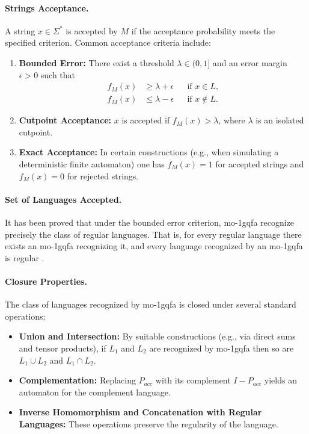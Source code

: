 \paragraph{Strings Acceptance.}  
A string $x\in\Sigma^*$ is accepted by $M$ if the acceptance probability meets the specified criterion. Common acceptance criteria include:
\begin{enumerate}
  \item \textbf{Bounded Error:} There exist a threshold $\lambda\in(0,1]$ and an error margin $\epsilon>0$ such that
  \[
  \begin{aligned}
  f_M(x) &\ge \lambda+\epsilon &&\text{if } x\in L,\\[1mm]
  f_M(x) &\le \lambda-\epsilon &&\text{if } x\notin L.
  \end{aligned}
  \]
  \item \textbf{Cutpoint Acceptance:} $x$ is accepted if $f_M(x)>\lambda$, where $\lambda$ is an isolated cutpoint.
  \item \textbf{Exact Acceptance:} In certain constructions (e.g., when simulating a deterministic finite automaton) one has $f_M(x)=1$ for accepted strings and $f_M(x)=0$ for rejected strings.
\end{enumerate}

\paragraph{Set of Languages Accepted.}  
It has been proved that under the bounded error criterion, \gls{mo-1gqfa} recognize precisely the class of regular languages. That is, for every regular language there exists an \gls{mo-1gqfa} recognizing it, and every language recognized by an \gls{mo-1gqfa} is regular \cite{li2012characterizations}.

\paragraph{Closure Properties.}  
The class of languages recognized by \gls{mo-1gqfa} is closed under several standard operations:
\begin{itemize}
  \item \textbf{Union and Intersection:} By suitable constructions (e.g., via direct sums and tensor products), if $L_1$ and $L_2$ are recognized by \gls{mo-1gqfa} then so are $L_1\cup L_2$ and $L_1\cap L_2$.
  \item \textbf{Complementation:} Replacing $P_{acc}$ with its complement $I-P_{acc}$ yields an automaton for the complement language.
  \item \textbf{Inverse Homomorphism and Concatenation with Regular Languages:} These operations preserve the regularity of the language.
\end{itemize}

